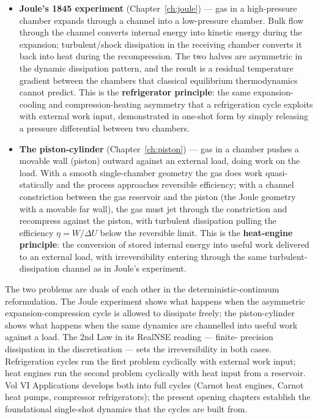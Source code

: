 \begin{itemize}
\item \textbf{Joule's 1845 experiment} (Chapter~\ref{ch:joule}) — gas in a
high-pressure chamber expands through a channel into a low-pressure chamber.
Bulk flow through the channel converts internal energy into kinetic energy
during the expansion; turbulent/shock dissipation in the receiving chamber
converts it back into heat during the recompression. The two halves are
asymmetric in the dynamic dissipation pattern, and the result is a residual
temperature gradient between the chambers that classical equilibrium
thermodynamics cannot predict. This is the \textbf{refrigerator principle}:
the same expansion-cooling and compression-heating asymmetry that a
refrigeration cycle exploits with external work input, demonstrated in
one-shot form by simply releasing a pressure differential between two
chambers.

\item \textbf{The piston-cylinder} (Chapter~\ref{ch:piston}) — gas in a chamber
pushes a movable wall (piston) outward against an external load, doing work
on the load. With a smooth single-chamber geometry the gas does work
quasi-statically and the process approaches reversible efficiency; with a
channel constriction between the gas reservoir and the piston (the
Joule geometry with a movable far wall), the gas must jet through the
constriction and recompress against the piston, with turbulent
dissipation pulling the efficiency $\eta = W/\Delta U$ below the
reversible limit. This is the \textbf{heat-engine principle}: the
conversion of stored internal energy into useful work delivered to an
external load, with irreversibility entering through the same
turbulent-dissipation channel as in Joule's experiment.
\end{itemize}

The two problems are duals of each other in the deterministic-continuum
reformulation. The Joule experiment shows what happens when the
asymmetric expansion-compression cycle is allowed to dissipate freely; the
piston-cylinder shows what happens when the same dynamics are channelled
into useful work against a load. The 2nd Law in its RealNSE reading — finite-
precision dissipation in the discretisation — sets the irreversibility in
both cases. Refrigeration cycles run the first problem cyclically with
external work input; heat engines run the second problem cyclically with
heat input from a reservoir. Vol VI Applications develops both into full
cycles (Carnot heat engines, Carnot heat pumps, compressor refrigerators);
the present opening chapters establish the foundational single-shot dynamics
that the cycles are built from.

